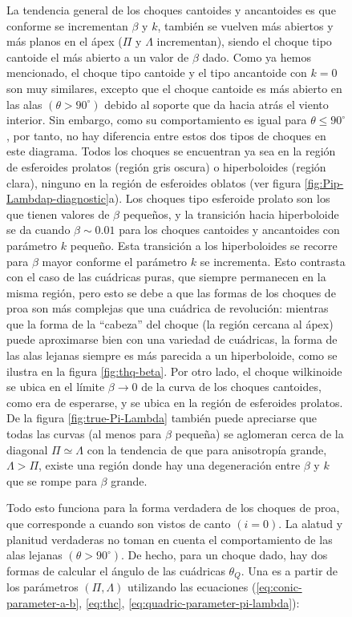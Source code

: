 \begin{figure}
La tendencia general de los choques cantoides y ancantoides es que conforme se incrementan $\beta$ y $k$, también se vuelven más abiertos y más planos en el ápex ($\Pi$ y $\Lambda$ incrementan), siendo el choque tipo cantoide el más abierto a un valor de $\beta$ dado. Como ya hemos mencionado, el choque tipo cantoide y el tipo ancantoide con $k=0$ son muy similares, excepto que el choque cantoide es más abierto en las alas $(\theta > 90^\circ)$ debido al soporte que da hacia atrás el viento interior. Sin embargo, como su comportamiento es igual para $\theta \leq 90^\circ$, por tanto, no hay diferencia entre estos dos tipos de choques en este diagrama. Todos los choques se encuentran ya sea en la región de esferoides prolatos (región gris oscura) o hiperboloides (región clara), ninguno en la región de esferoides oblatos (ver figura \ref{fig:Pip-Lambdap-diagnostic}a). Los choques tipo esferoide prolato son los que tienen valores de $\beta$ pequeños, y la transición hacia hiperboloide se da cuando $\beta \sim 0.01$ para los choques cantoides y ancantoides con parámetro $k$ pequeño. Esta transición a los hiperboloides se recorre para $\beta$ mayor conforme el parámetro $k$ se incrementa. Esto contrasta con el caso de las cuádricas puras, que siempre permanecen en la misma región, pero esto se debe a que las formas de los choques de proa son más complejas que una cuádrica de revolución: mientras que la forma de la ``cabeza'' del choque (la región cercana al ápex) puede aproximarse bien con una variedad de cuádricas, la forma de las alas lejanas siempre es más parecida a un hiperboloide, como se ilustra en la figura \ref{fig:thq-beta}. Por otro lado, el choque wilkinoide se ubica en el límite $\beta\to 0$ de la curva de los choques cantoides, como era de esperarse, y se ubica en la región de esferoides prolatos. De la figura \ref{fig:true-Pi-Lambda} también puede apreciarse que todas las curvas (al menos para $\beta$ pequeña) se aglomeran cerca de la diagonal $\Pi \simeq \Lambda$ con la tendencia de que para anisotropía grande, $\Lambda > \Pi$, existe una región donde hay una degeneración entre $\beta$ y $k$ que se rompe para $\beta$ grande.

Todo esto funciona para la forma verdadera de los choques de proa, que corresponde a cuando son vistos de canto $(i=0)$. La alatud y planitud verdaderas no toman en cuenta el comportamiento de las alas lejanas $(\theta > 90^\circ)$. De hecho, para un choque dado, hay dos formas de calcular el ángulo de las cuádricas $\theta_Q$. Una es a partir de los parámetros $(\Pi, \Lambda)$ utilizando las ecuaciones (\ref{eq:conic-parameter-a-b}, \ref{eq:thc}, \ref{eq:quadric-parameter-pi-lambda}):


\end{figure}
